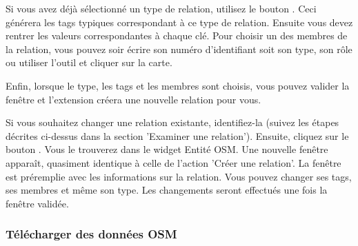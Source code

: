 Si vous avez déjà sélectionné un type de relation, utilisez le bouton . Ceci générera les tags typiques correspondant à ce type de relation. Ensuite vous devez rentrer les valeurs correspondantes à chaque clé. Pour choisir un des membres de la relation, vous pouvez soir écrire son numéro d'identifiant soit son type, son rôle ou utiliser l'outil  et cliquer sur la carte.

Enfin, lorsque le type, les tags et les membres sont choisis, vous pouvez valider la fenêtre et l'extension créera une nouvelle relation pour vous.


Si vous souhaitez changer une relation existante, identifiez-la (suivez les étapes décrites ci-dessus dans la section 'Examiner une relation'). Ensuite, cliquez sur le bouton . Vous le trouverez dans le widget Entité OSM. Une nouvelle fenêtre apparaît, quasiment identique à celle de l'action 'Créer une relation'. La fenêtre est préremplie avec les informations sur la relation. Vous pouvez changer ses tags, ses membres et même son type. Les changements seront effectués une fois la fenêtre validée.

\subsubsection{Télécharger des données OSM}  


